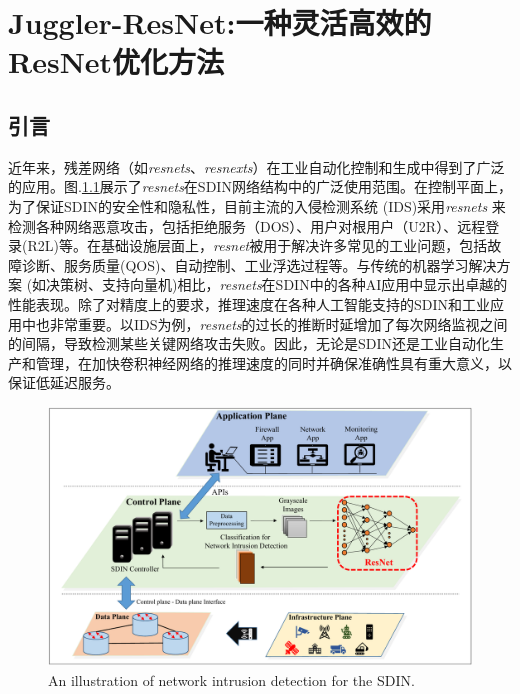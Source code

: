 
\chapter{Juggler-ResNet:一种灵活高效的ResNet优化方法}

\section{引言}

近年来，残差网络（如\emph{resnets}、\emph{resnexts}）在工业自动化控制和生成中得到了广泛的应用。图.\ref{NIDS}展示了\emph{resnets}在SDIN网络结构中的广泛使用范围。在控制平面上，为了保证SDIN的安全性和隐私性，目前主流的入侵检测系统 (IDS)采用\emph{resnets} \cite{masum2021transfer,song2020real,man2021residual}来检测各种网络恶意攻击，包括拒绝服务（DOS）、用户对根用户（U2R）、远程登录(R2L)等。在基础设施层面上，\emph{resnet}被用于解决许多常见的工业问题，包括故障诊断\cite{8850096}、服务质量(QOS)、自动控制\cite{9166726}、工业浮选过程\cite{9166726,FU2019183}等。与传统的机器学习解决方案 (如决策树、支持向量机)相比，\emph{resnets}在SDIN中的各种AI应用中显示出卓越的性能表现。除了对精度上的要求，推理速度在各种人工智能支持的SDIN和工业应用中也非常重要。以IDS为例，\emph{resnets}的过长的推断时延增加了每次网络监视之间的间隔，导致检测某些关键网络攻击失败。因此，无论是SDIN还是工业自动化生产和管理，在加快卷积神经网络的推理速度的同时并确保准确性具有重大意义，以保证低延迟服务\cite{8850096,9173723,9187678,9173697}。
\begin{figure}[ht]
	\centering
	\includegraphics[width=1\textwidth]{figures/Jresnet/FIG1_TII-21-2603.pdf}
	\caption{An illustration of network intrusion detection for the SDIN.}
	\label{NIDS}
\end{figure}


